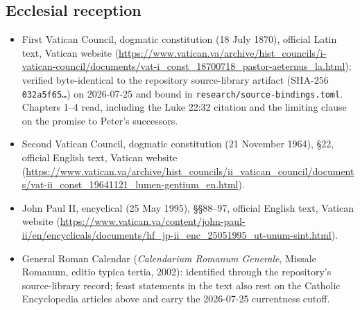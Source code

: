 \subsection*{Ecclesial reception}

\begin{itemize}
\item First Vatican Council, dogmatic constitution 
(18 July 1870), official Latin text, Vatican website
(\url{https://www.vatican.va/archive/hist_councils/i-vatican-council/documents/vat-i_const_18700718_pastor-aeternus_la.html});
verified byte-identical to the repository source-library artifact
(SHA-256 \texttt{032a5f65\ldots}) on 2026-07-25 and bound in
\texttt{research/source-bindings.toml}. Chapters 1--4 read, including the
Luke 22:32 citation and the limiting clause on the promise to Peter's
successors.
\item Second Vatican Council, dogmatic constitution 
(21 November 1964), \S 22, official English text, Vatican website
(\url{https://www.vatican.va/archive/hist_councils/ii_vatican_council/documents/vat-ii_const_19641121_lumen-gentium_en.html}).
\item John Paul II, encyclical  (25 May 1995),
\S\S 88--97, official English text, Vatican website
(\url{https://www.vatican.va/content/john-paul-ii/en/encyclicals/documents/hf_jp-ii_enc_25051995_ut-unum-sint.html}).
\item General Roman Calendar (\textit{Calendarium Romanum Generale},
Missale Romanum, editio typica tertia, 2002): identified through the
repository's source-library record; feast statements in the text also
rest on the Catholic Encyclopedia articles above and carry the 2026-07-25
currentness cutoff.
\end{itemize}

\endgroup
